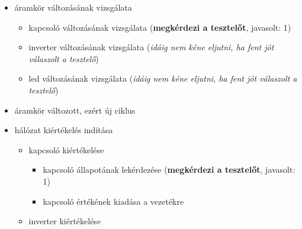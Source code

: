 {\begin{itemize}
\begin{itemize}
\begin{itemize}
	\item inverter kiértékelése
	\begin{itemize}
	\setlength{\itemsep}{0cm}%
	\setlength{\parskip}{0cm}%
	\setlength{\itemindent}{-35pt}%
		\item bemenet lekérdezése (\textbf{megkérdezi a tesztelőt}, javasolt: 1)
		\item kimenet kiadása a vezetékre (\textbf{megkérdezi a tesztelőt}, javasolt: 0)
	\end{itemize}\item led kiértékelése
	\begin{itemize}
	\setlength{\itemsep}{0cm}%
	\setlength{\parskip}{0cm}%
	\setlength{\itemindent}{-35pt}%
		\item led bemenetének lekérdezése (\textbf{megkérdezi a tesztelőt}, javasolt: 0)
		\item bemenettől függően világít/nem világít.
	\end{itemize}
\end{itemize}
\item áramkör változásának vizsgálata
\begin{itemize}
\setlength{\itemsep}{0cm}%
\setlength{\parskip}{0cm}%
\setlength{\itemindent}{-25pt}%
	\item kapcsoló változásának vizsgálata (\textbf{megkérdezi a tesztelőt}, javasolt: 1)
	\item inverter változásának vizsgálata (\textit{idáig nem kéne eljutni, ha fent jót válaszolt a tesztelő})
	\item led változásának vizsgálata (\textit{idáig nem kéne eljutni, ha fent jót válaszolt a tesztelő})
\end{itemize}
\item áramkör változott, ezért új ciklus
\item hálózat kiértékelés indítása
\begin{itemize}
\setlength{\itemsep}{0cm}%
\setlength{\parskip}{0cm}%
\setlength{\itemindent}{-25pt}%
	\item kapcsoló kiértékelése
	\begin{itemize}
	\setlength{\itemsep}{0cm}%
	\setlength{\parskip}{0cm}%
	\setlength{\itemindent}{-35pt}%
		\item kapcsoló állapotának lekérdezése (\textbf{megkérdezi a tesztelőt}, javasolt: 1)
		\item kapcsoló értékének kiadása a vezetékre
	\end{itemize}
	\item inverter kiértékelése
	\begin{itemize}

\end{itemize}
\end{itemize}
\end{itemize}
\end{itemize}}

